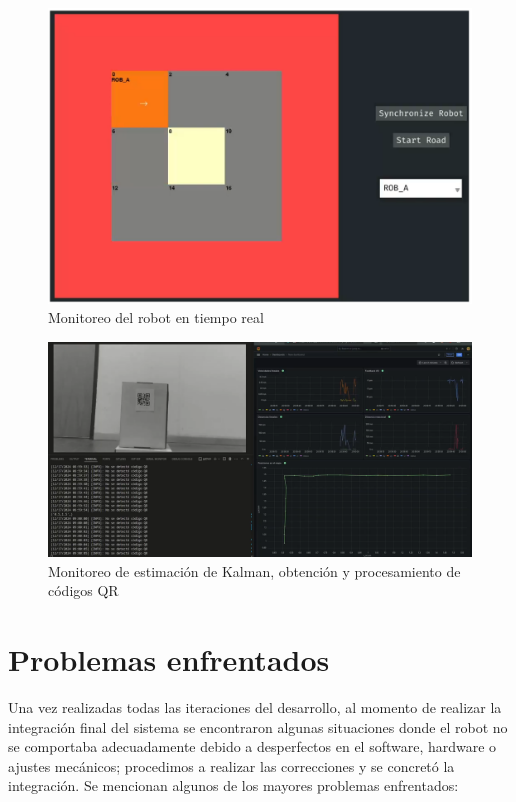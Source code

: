 \begin{figure}[H]
    \centering
    \includegraphics[width=0.8\linewidth]{images/integ_sistema_interfaz_python.png}
    \caption{Monitoreo del robot en tiempo real}
    \label{fig:integsistemainterfaz}
\end{figure}

\begin{figure}[H]
    \centering
    \hspace*{-1.1cm}
    \includegraphics[width=1.2\linewidth]{images/integ_sistema_interfaz_camara_grafana.png}
    \caption{Monitoreo de estimación de Kalman, obtención y procesamiento de códigos QR}
    \label{fig:integsistemainterfazgrafana}
\end{figure}


\section{Problemas enfrentados}

Una vez realizadas todas las iteraciones del desarrollo, al momento de realizar la integración final del sistema se encontraron algunas situaciones donde el robot no se comportaba adecuadamente debido a desperfectos en el software, hardware o ajustes mecánicos; procedimos a realizar las correcciones y se concretó la integración. Se mencionan algunos de los mayores problemas enfrentados:


